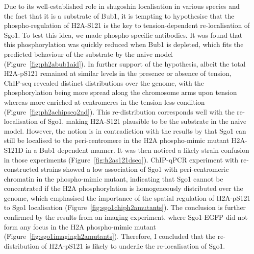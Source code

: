 Due to its well-established role in shugoshin localisation in various species and the fact that it is a substrate of Bub1, it is tempting to hypothesise that the phospho-regulation of H2A-S121 is the key to tension-dependent re-localisation of Sgo1. To test this idea, we made phospho-specific antibodies. It was found that this phosphorylation was quickly reduced when Bub1 is depleted, which fits the predicted behaviour of the substrate by the naive model (Figure~\ref{fig:ph2abub1aid}). In further support of the hypothesis, albeit the total H2A-pS121 remained at similar levels in the presence or absence of tension, ChIP-seq revealed distinct distributions over the genome, with the phosphorylation being more spread along the chromosome arms upon tension whereas more enriched at centromeres in the tension-less condition (Figure~\ref{fig:ph2achipseq2nd}). This re-distribution corresponds well with the re-localisation of Sgo1, making H2A-S121 plausible to be the substrate in the naive model. However, the notion is in contradiction with the results by \cite{Nerusheva2014} that Sgo1 can still be localised to the peri-centromere in the H2A phospho-mimic mutant H2A-S121D in a Bub1-dependent manner. It was then noticed a likely strain confusion in those experiments (Figure~\ref{fig:h2as121dseq}). ChIP-qPCR experiment with re-constructed strains showed a low association of Sgo1 with peri-centromeric chromatin in the phospho-mimic mutant, indicating that Sgo1 cannot be concentrated if the H2A phosphorylation is homogeneously distributed over the genome, which emphasised the importance of the spatial regulation of H2A-pS121 to Sgo1 localisation (Figure~\ref{fig:sgo1chiph2amutants}). The conclusion is further confirmed by the results from an imaging experiment, where Sgo1-EGFP did not form any focus in the H2A phospho-mimic mutant (Figure~\ref{fig:sgo1imagingh2amutants}). Therefore, I concluded that the re-distribution of H2A-pS121 is likely to underlie the re-localisation of Sgo1. 

